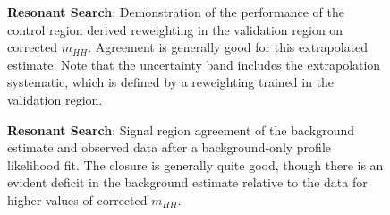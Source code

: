 \begin{figure}[ht]
  \centering
  \caption{\label{fig:res-vr-mhh} \textbf{Resonant Search}: Demonstration of the performance 
  of the control region derived reweighting in the validation region on corrected $m_{HH}$. Agreement 
  is generally good for this extrapolated estimate. Note that the uncertainty band includes the 
  extrapolation systematic, which is defined by a reweighting trained in the validation region.}
\end{figure}

\begin{figure}[ht]
  \centering
  \caption{\label{fig:res-sr-mhh} \textbf{Resonant Search}: Signal region agreement of the background estimate and 
  observed data after a background-only profile likelihood fit. The closure is generally quite good, 
  though there is an evident deficit in the background estimate relative to the data for higher values 
  of corrected $m_{HH}$.}
\end{figure}

